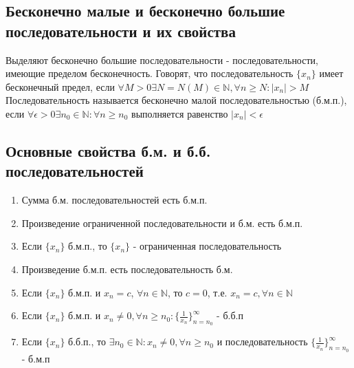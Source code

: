 \documentclass[oneside]{book}
\begin{document}
\begin{enumerate}
\chapter{Бесконечно малые и бесконечно большие последовательности и их свойства\\}
Выделяют бесконечно большие последовательности - последовательности, имеющие пределом бесконечность.
Говорят, что последовательность $\{x_n\}$ имеет бесконечный предел, если $\forall M>0 \exists N=N(M)\in\mathbb{N}, \forall n \geq N : |x_n|>M$
Последовательность называется бесконечно малой последовательностью (б.м.п.), если $\forall \epsilon > 0 \exists n_0 \in \mathbb{N}: \forall n\geq n_0$ выполняется равенство $ |x_n|<\epsilon$
\section{Основные свойства б.м. и б.б. последовательностей}
\begin{enumerate}
\item Сумма б.м. последовательностей есть б.м.п.
\item Произведение ограниченной последовательности и б.м. есть б.м.п.
\item Если $\{x_n\}$ б.м.п., то $\{x_n\}$ - ограниченная последовательность
\item Произведение б.м.п. есть последовательность б.м.
\item Если $\{x_n\}$ б.м.п. и $x_n = c$, $\forall n \in \mathbb{N}$, то $c=0$, т.е. $x_n = c,  \forall n \in
\mathbb{N}$
\item Если $\{x_n\}$ б.м.п. и $x_n \neq 0,  \forall n\geq n_0: \{\frac{1}{x_n}\}^\infty_{n=n_0}$ - б.б.п
\item Если $\{x_n\}$ б.б.п., то $\exists n_0 \in \mathbb{N}:x_n \neq 0,  \forall n\geq n_0$ и последовательность $ \{\frac{1}{x_n}\}^\infty_{n=n_0}$ - б.м.п
\end{enumerate}


\end{enumerate}
\end{document}
